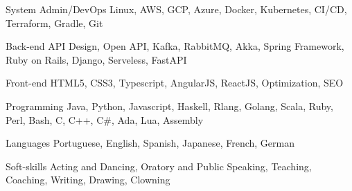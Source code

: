 

\begin{cvskills}

  \cvskill
    {System Admin/DevOps} %
    {Linux, AWS, GCP, Azure, Docker, Kubernetes, CI/CD, Terraform, Gradle, Git} %

  \cvskill
    {Back-end} %
    {API Design, Open API, Kafka, RabbitMQ, Akka, Spring Framework, Ruby on Rails, Django, Serveless, FastAPI} %

  \cvskill
    {Front-end} %
    {HTML5, CSS3, Typescript, AngularJS, ReactJS, Optimization, SEO} %

  \cvskill
    {Programming} %
    {Java, Python, Javascript, Haskell, Rlang, Golang, Scala, Ruby, Perl, Bash, C, C++, C\#, Ada, Lua, Assembly} %

  \cvskill
    {Languages} %
    {Portuguese, English, Spanish, Japanese, French, German} %

  \cvskill
  {Soft-skills} %
  {Acting and Dancing, Oratory and Public Speaking, Teaching, Coaching, Writing, Drawing, Clowning} %

\end{cvskills}
